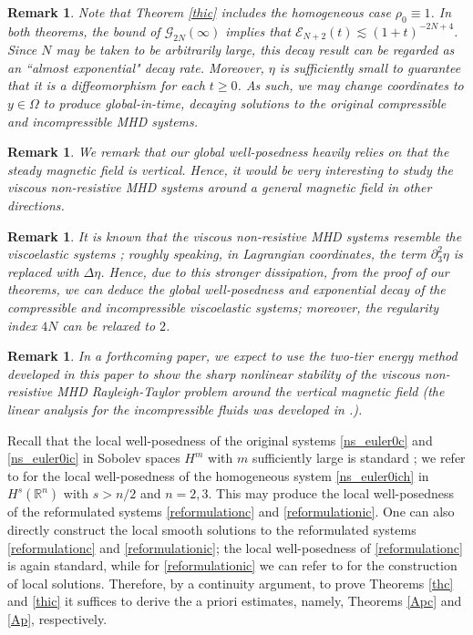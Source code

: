 \documentclass[a4paper,reqno,11pt]{amsart}
\numberwithin{equation}{section}
\providecommand{\se}[1]{\mathcal{E}_{#1}}
\newtheorem{remark}[lem]{Remark}
\begin{document}
\begin{remark}
Note that Theorem \ref{thic} includes the homogeneous case $\rho_0\equiv 1$. In both theorems, the bound of $\mathcal{G}_{2N}(\infty)$ implies that $\se{N+2} (t) {\lesssim} (1+t)^{-2N+4} $. Since $N$ may be taken to be arbitrarily large, this decay result can be regarded as an ``almost exponential" decay rate. Moreover, $\eta$ is sufficiently small to guarantee that it is a diffeomorphism for each $t\ge 0$. As such, we may change coordinates to $y\in\Omega$ to produce global-in-time, decaying solutions to the original compressible and incompressible MHD systems.
\end{remark}
\begin{remark}
We remark that our global well-posedness heavily relies on that the steady magnetic field is vertical. Hence, it would be very interesting to study the viscous non-resistive MHD systems around a general magnetic field in other directions.
\end{remark}
\begin{remark}
It is known that the viscous non-resistive MHD systems resemble the viscoelastic systems \cite{Lin,LLZ,LZ}; roughly speaking, in Lagrangian coordinates, the term ${\partial}_3^2\eta$ is replaced with $\Delta\eta$. Hence, due to this stronger dissipation, from the proof of our theorems, we can deduce the global well-posedness and exponential decay of the compressible and incompressible viscoelastic systems; moreover, the regularity index $4N$ can be relaxed to $2$.
\end{remark}
\begin{remark}
In a forthcoming paper, we expect to use the two-tier energy method developed in this paper to show the sharp nonlinear stability of the viscous non-resistive MHD Rayleigh-Taylor problem around the vertical magnetic field (the linear analysis for the incompressible fluids was developed in \cite{W}.).
\end{remark}

Recall that the local well-posedness of the original systems \eqref{ns_euler0c} and \eqref{ns_euler0ic} in Sobolev spaces $H^m$ with $m$ sufficiently large is standard \cite{K}; we refer to \cite{F} for the local well-posedness of the homogeneous system \eqref{ns_euler0ich} in $H^s(\mathbb{R}^n)$ with $s>n/2$ and $n=2,3$. This may produce the local well-posedness of the reformulated systems \eqref{reformulationc} and \eqref{reformulationic}. One can also directly construct the local smooth solutions to the reformulated systems \eqref{reformulationc} and \eqref{reformulationic}; the local well-posedness of \eqref{reformulationc} is again standard, while for \eqref{reformulationic} we can refer to \cite{GT_lwp} for the construction of local solutions. Therefore, by a continuity argument, to prove Theorems \ref{thc} and \ref{thic} it suffices to derive the a priori estimates, namely, Theorems \ref{Apc} and \ref{Ap}, respectively.
\end{document}
